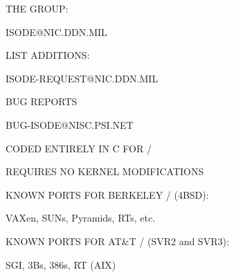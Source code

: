 \begin{bwslide}

\begin{nrtc}
\item	THE GROUP:
    \begin{nrtc}
    \item	ISODE@NIC.DDN.MIL
    \end{nrtc}

\item	LIST ADDITIONS:
    \begin{nrtc}
    \item	ISODE-REQUEST@NIC.DDN.MIL
    \end{nrtc}

\item	BUG REPORTS
    \begin{nrtc}
    \item	BUG-ISODE@NISC.PSI.NET
    \end{nrtc}
\end{nrtc}
\end{bwslide}


\begin{bwslide}

\begin{nrtc}
\item	CODED ENTIRELY IN C FOR \unix/
    \begin{nrtc}
    \item	REQUIRES NO KERNEL MODIFICATIONS    
    \end{nrtc}

\item	KNOWN PORTS FOR BERKELEY \unix/ (4BSD):
    \begin{nrtc}
    \item	VAXen, SUNs, Pyramids, RTs, etc.
    \end{nrtc}

\item	KNOWN PORTS FOR AT\&T \unix/ (SVR2 and SVR3):
    \begin{nrtc}
    \item	SGI, 3Bs, 386s, RT (AIX)
    \end{nrtc}
\end{nrtc}
\end{bwslide}
